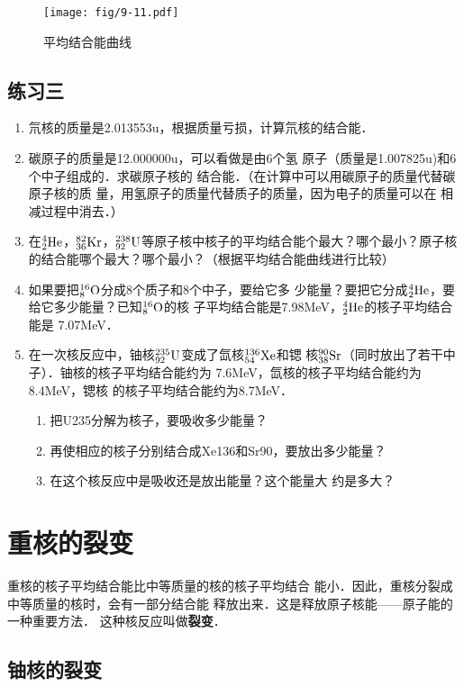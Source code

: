 \begin{figure}[htp]
\centering
\texttt{[image: fig/9-11.pdf]}
\caption{平均结合能曲线}
\end{figure}


\subsection*{练习三}

\begin{enumerate}
    \item 氘核的质量是2.013553u，根据质量亏损，计算氘核的结合能．
    \item 碳原子的质量是12.000000u，可以看做是由6个氢
原子（质量是1.007825u)和6个中子组成的．求碳原子核的
结合能．（在计算中可以用碳原子的质量代替碳原子核的质
量，用氢原子的质量代替质子的质量，因为电子的质量可以在
相减过程中消去．）
\item  在$\atom{He}{4}{2}$，$\atom{Kr}{82}{36}$，$\atom{U}{238}{92}$等原子核中核子的平均结合能个最大？哪个最小？原子核的结合能哪个最大？哪个最小？（根据平均结合能曲线进行比较）
\item 如果要把$\atom{O}{16}{8}$分成8个质子和8个中子，要给它多
少能量？要把它分成$\atom{He}{4}{2}$，要给它多少能量？已知$\atom{O}{16}{8}$的核
子平均结合能是7.98MeV，$\atom{He}{4}{2}$的核子平均结合能是
7.07MeV．
\item 在一次核反应中，铀核$\atom{U}{235}{92}$变成了氙核$\atom{Xe}{136}{54}$和锶
核$\atom{Sr}{90}{38}$（同时放出了若干中子）．铀核的核子平均结合能约为
7.6MeV，氙核的核子平均结合能约为8.4MeV，锶核
的核子平均结合能约为8.7MeV．
\begin{enumerate}
    \item 把U235分解为核子，要吸收多少能量？
    \item 再使相应的核子分别结合成Xe136和Sr90，要放出多少能量？
    \item 在这个核反应中是吸收还是放出能量？这个能量大
约是多大？
\end{enumerate}
\end{enumerate}


\section{重核的裂变}
重核的核子平均结合能比中等质量的核的核子平均结合
能小．因此，重核分裂成中等质量的核时，会有一部分结合能
释放出来．这是释放原子核能——原子能的一种重要方法．
这种核反应叫做\textbf{裂变}．

\subsection{铀核的裂变}


